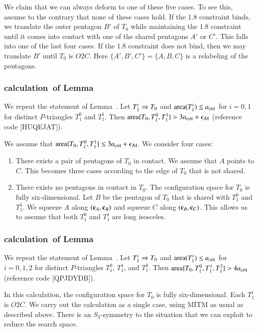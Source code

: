 We claim that we can always deform to one of these five cases.  To see
this, assume to the contrary that none of these cases hold.  If the
$1.8$ constraint binds, we translate the outer pentagon $B'$ of $T_0$
while maintaining the $1.8$ constraint until it comes into contact
with one of the shared pentagons $A'$ or $C'$. This falls into one of
the last four cases.  If the $1.8$ constraint does not bind, then we
may translate $B'$ until $T_0$ is $O2C$.  Here
$\{A',B',C'\}=\{A,B,C\}$ is a relabeling of the pentagons.

\subsubsection{calculation~of Lemma~} %

We repeat the statement of Lemma~.  Let $T_1^i\Rightarrow T_0$
and ${\operatorname{area}}(T_1^i)\le a_\text{crit}$ for $i=0,1$ for distinct $P$-triangles
$T_1^0$ and $T_1^1$.  Then ${\operatorname{area}}\{T_0,T_1^0,T_1^1\} > 3a_\text{crit} +
\epsilon_{\mathcal M}$ (reference code [HUQEJAT]).

We assume that ${\operatorname{area}}\{T_0,T_1^0,T_1^1\}\le 3a_\text{crit} + \epsilon_{\mathcal M}$.  We
consider four cases:
\begin{enumerate}  
\item There exists a pair of pentagons of $T_0$ in contact.  We assume
  that $A$ points to $C$.  This becomes three cases according to
  the edge of $T_0$ that is not shared.
\item There exists no pentagons in contact in $T_0$.  The
  configuration space for $T_0$ is fully six-dimensional.  Let $B$ be
  the pentagon of $T_0$ that is shared with $T_1^0$ and $T_1^1$.  We
  squeeze $A$ along $({\mathbf c}_A,{\mathbf c}_B)$ and squeeze $C$ along $({\mathbf c}_B,{\mathbf c}_C)$.
  This allows us to assume that both $T_1^0$ and $T_1^1$ are long
  isosceles.
\end{enumerate}  

\subsubsection{calculation~of Lemma~} 

We repeat the statement of Lemma~.  Let $T_1^i\Rightarrow T_0$
and ${\operatorname{area}}(T_1^i)\le a_\text{crit}$ for $i=0,1,2$ for distinct $P$-triangles
$T_1^0$, $T_1^1$, and $T_1^2$.  Then ${\operatorname{area}}\{T_0,T_1^0,T_1^1,T_1^2\} >
4a_\text{crit}$ (reference code [QPJDYDB]).

In this calculation, the configuration space for $T_0$ is fully
six-dimensional.  Each $T_1^i$ is $O2C$.  We carry out the calculation
as a single case, using MITM as usual as described above.  There is an
$S_3$-symmetry to the situation that we can exploit to reduce the
search space.
